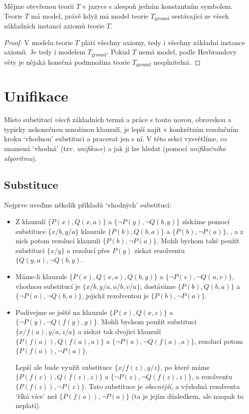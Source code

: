 \begin{corollary}\label{corollary:herbrands-theorem-corollary-ground}
    Mějme otevřenou teorii $T$ v jazyce s alespoň jedním konstantním symbolem. Teorie $T$ má model, právě když má model teorie $T_\text{ground}$ sestávající ze všech základních instancí axiomů teorie $T$.
\end{corollary}
\begin{proof}
V modelu teorie $T$ platí všechny axiomy, tedy i všechny základní instance axiomů. Je tedy i modelem $T_\text{ground}$. Pokud $T$ nemá model, podle Herbrandovy věty je nějaká konečná podmnožina teorie $T_\text{ground}$ nesplnitelná.
\end{proof}


\section{Unifikace}\label{section:unification}

Místo substitucí \emph{všech} základních termů a práce s touto novou, obrovskou a typicky nekonečnou množinou klauzulí, je lepší najít v konkrétním rezolučním kroku `vhodnou' substituci a pracovat jen s ní. V této sekci vysvětlíme, co znamená `vhodná' (tzv. \emph{unifikace}) a jak ji lze hledat (pomocí \emph{unifikačního 
algoritmu}).

\subsection{Substituce}

Nejprve uveďme několik příkladů `vhodných' substitucí:

\begin{example}\label{example:substitutions}
\begin{itemize}
    \item Z klauzulí $\{P(x),Q(x,a)\}$ a $\{\neg P(y),\neg Q(b,y)\}$ získáme pomocí substituce $\{x/b,y/a\}$ klauzule $\{P(b),Q(b,a)\}$ a $\{P(b),\neg P(a)\}$, , a z nich potom rezolucí klauzuli $\{P(b),\neg P(a)\}$. Mohli bychom také použít substituci $\{x/y\}$ a rezolucí přes $P(y)$ získat rezolventu $\{Q(y,a),\neg Q(b,y)$.
    \item Máme-li klauzule $\{P(x),Q(x,a),Q(b,y)\}$ a $\{\neg P(v),\neg Q(u,v)\}$, vhodnou substitucí je $\{x/b,y/a,u/b,v/a\}$; dostáváme $\{P(b),Q(b,a)\}$ a $\{\neg P(a),\neg Q(b,a)\}$, jejichž rezolventou je $\{P(b),\neg P(a)\}$.
    \item Podívejme se ještě na klauzule $\{P(x),Q(x,z)\}$ a $\{\neg P(y),\neg Q(f(y),y)\}$. Mohli bychom použít substituci $\{x/f(a),y/a,z/a\}$ a získat tak dvojici klauzulí $\{P(f(a)),Q(f(a),a)\}$ a $\{\neg P(a),\neg Q(f(a),a)\}$, rezolucí potom $\{P(f(a)),\neg P(a)\}$.
    
    Lepší ale bude využít substituce $\{x/f(z),y/z\}$, po které máme $\{P(f(z)),Q(f(z),z)\}$ a $\{\neg P(z),\neg Q(f(z),z)\}$, a rezolventu $\{P(f(z)),\neg P(z)\}$. Tato substituce je \emph{obecnější}, a výsledná rezolventa `říká více' než $\{P(f(a)),\neg P(a)\}$ (ta je jejím důsledkem, ale naopak to neplatí).
\end{itemize}
\end{example}

